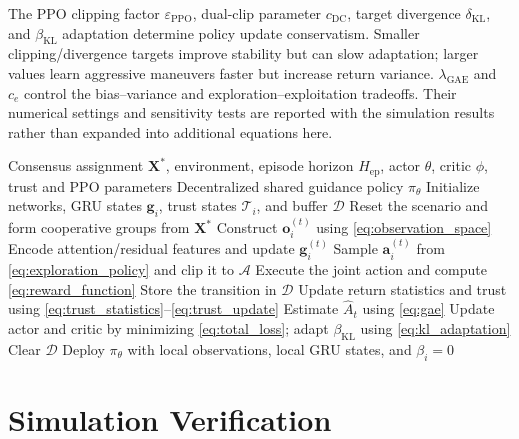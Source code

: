 \documentclass[lettersize,journal]{IEEEtran}
\begin{document}
The PPO clipping factor $\varepsilon_{\mathrm{PPO}}$, dual-clip parameter $c_{\mathrm{DC}}$,
target divergence $\delta_{\mathrm{KL}}$, and $\beta_{\mathrm{KL}}$ adaptation determine policy
update conservatism. Smaller clipping/divergence targets improve stability but can slow
adaptation; larger values learn aggressive maneuvers faster but increase return variance.
$\lambda_{\mathrm{GAE}}$ and $c_e$ control the bias--variance and exploration--exploitation
tradeoffs. Their numerical settings and sensitivity tests are reported with the simulation
results rather than expanded into additional equations here.

\begin{algorithm}[!t]
\caption{ART-MAPPO Cooperative Interception Guidance}
\label{alg:artmappo}
\footnotesize
\begin{algorithmic}[1]
\REQUIRE Consensus assignment $\mathbf X^{*}$, environment, episode horizon
$H_{\mathrm{ep}}$, actor $\theta$, critic $\phi$, trust and PPO parameters
\ENSURE Decentralized shared guidance policy $\pi_{\theta}$
\STATE Initialize networks, GRU states $\mathbf g_i$, trust states $\mathcal T_i$, and buffer
$\mathcal D$
    \STATE Reset the scenario and form cooperative groups from $\mathbf X^{*}$
            \STATE Construct $\mathbf o_i^{(t)}$ using \eqref{eq:observation_space}
            \STATE Encode attention/residual features and update $\mathbf g_i^{(t)}$
            \STATE Sample $\mathbf a_i^{(t)}$ from \eqref{eq:exploration_policy} and clip it
            to $\mathcal A$
        \ENDFOR
        \STATE Execute the joint action and compute \eqref{eq:reward_function}
        \STATE Store the transition in $\mathcal D$
    \ENDFOR
    \STATE Update return statistics and trust using
    \eqref{eq:trust_statistics}--\eqref{eq:trust_update}
    \STATE Estimate $\widehat A_t$ using \eqref{eq:gae}
    \STATE Update actor and critic by minimizing \eqref{eq:total_loss}; adapt
    $\beta_{\mathrm{KL}}$ using \eqref{eq:kl_adaptation}
    \STATE Clear $\mathcal D$
\ENDFOR
\STATE Deploy $\pi_{\theta}$ with local observations, local GRU states, and $\beta_i=0$
\end{algorithmic}
\end{algorithm}
 
\endgroup
\section{Simulation Verification}
\label{sec:simulation}
\end{document}

